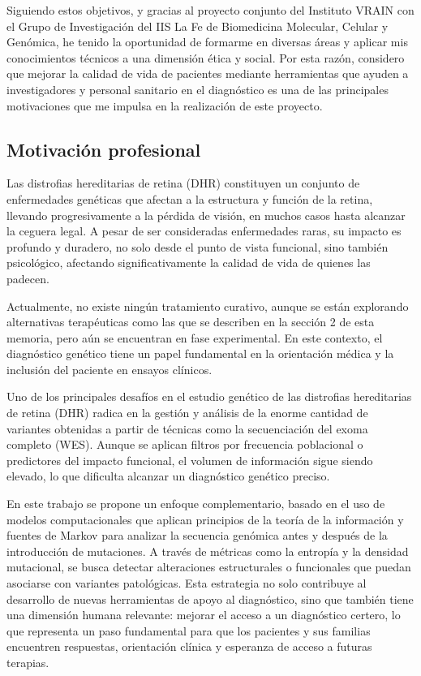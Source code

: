 \documentclass[11pt,spanish,listoffigures,listoftables]{tfgetsinf}
\begin{document}
Siguiendo estos objetivos, y gracias al proyecto conjunto del Instituto VRAIN con el Grupo de Investigación del IIS La Fe de Biomedicina Molecular, Celular y Genómica, he tenido la oportunidad de formarme en diversas áreas y aplicar mis conocimientos técnicos a una dimensión ética y social. Por esta razón, considero que mejorar la calidad de vida de pacientes mediante herramientas que ayuden a investigadores y personal sanitario en el diagnóstico es una de las principales motivaciones que me impulsa en la realización de este proyecto. 

\subsection{Motivación profesional}
Las distrofias hereditarias de retina (DHR) constituyen un conjunto de enfermedades genéticas que afectan a la estructura y función de la retina, llevando progresivamente a la pérdida de visión, en muchos casos hasta alcanzar la ceguera legal. A pesar de ser consideradas enfermedades raras, su impacto es profundo y duradero, no solo desde el punto de vista funcional, sino también psicológico, afectando significativamente la calidad de vida de quienes las padecen\cite{STO}.

Actualmente, no existe ningún tratamiento curativo, aunque se están explorando alternativas terapéuticas como las que se describen en la sección 2 de esta memoria, pero aún se encuentran en fase experimental. En este contexto, el diagnóstico genético tiene un papel fundamental en la orientación médica y la inclusión del paciente en ensayos clínicos\cite{HAN}.

Uno de los principales desafíos en el estudio genético de las distrofias hereditarias de retina (DHR) radica en la gestión y análisis de la enorme cantidad de variantes obtenidas a partir de técnicas como la secuenciación del exoma completo (WES). Aunque se aplican filtros por frecuencia poblacional o predictores del impacto funcional, el volumen de información sigue siendo elevado, lo que dificulta alcanzar un diagnóstico genético preciso\cite{DEC}.

En este trabajo se propone un enfoque complementario, basado en el uso de modelos computacionales que aplican principios de la teoría de la información y fuentes de Markov para analizar la secuencia genómica antes y después de la introducción de mutaciones. A través de métricas como la entropía y la densidad mutacional, se busca detectar alteraciones estructurales o funcionales que puedan asociarse con variantes patológicas. Esta estrategia no solo contribuye al desarrollo de nuevas herramientas de apoyo al diagnóstico, sino que también tiene una dimensión humana relevante: mejorar el acceso a un diagnóstico certero, lo que representa un paso fundamental para que los pacientes y sus familias encuentren respuestas, orientación clínica y esperanza de acceso a futuras terapias. 
\end{document}
